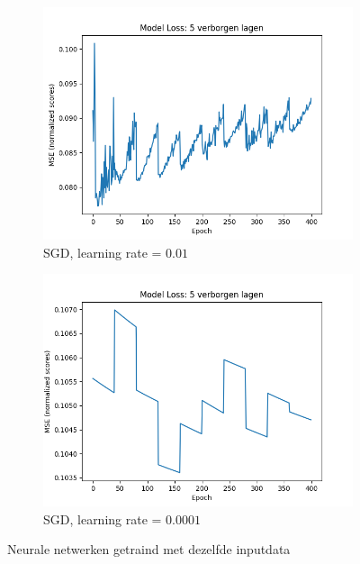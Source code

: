 \begin{figure}[H]
    \begin{subfigure}{.5\textwidth}
        \centering
        \includegraphics[width=1\linewidth]{fig/chapt5/inleiding/mlp5_2023-05-19_13h32__EPOCHS=400_LOSS=0.0929_LR=0.01.png}
        \caption{SGD, learning rate = $0.01$}
        \label{fig:chapt5_inleiding_sgd_suckt_1}
    \end{subfigure}
    \begin{subfigure}{.5\textwidth}
        \centering
        \includegraphics[width=1\linewidth]{fig/chapt5/inleiding/mlp5_2023-05-19_13h32__EPOCHS=400_LOSS=0.105_LR=0.0001.png}
        \caption{SGD, learning rate = $0.0001$}
        \label{fig:chapt5_inleiding_sgd_suckt_2}
    \end{subfigure}
    \caption{Neurale netwerken getraind met dezelfde inputdata}
    \label{fig:chapt5_inleiding_sgd_suckt_combined}
\end{figure}


